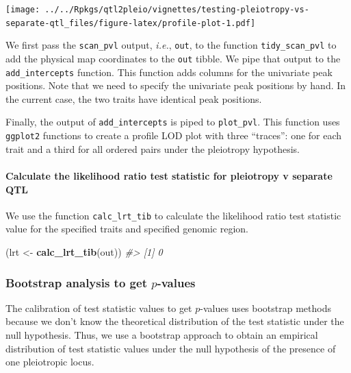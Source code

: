 \documentclass[oneside]{book}\usepackage[]{graphicx}\usepackage[]{color}
\newenvironment{Shaded}{\begin{snugshade}}{\end{snugshade}}
\newcommand{\CommentTok}[1]{\textcolor[rgb]{0.56,0.35,0.01}{\textit{#1}}}
\newcommand{\KeywordTok}[1]{\textcolor[rgb]{0.13,0.29,0.53}{\textbf{#1}}}
\newcommand{\NormalTok}[1]{#1}
\newcommand{\StringTok}[1]{\textcolor[rgb]{0.31,0.60,0.02}{#1}}
\begin{document}
\texttt{[image: ../../Rpkgs/qtl2pleio/vignettes/testing-pleiotropy-vs-separate-qtl\_files/figure-latex/profile-plot-1.pdf]}

We first pass the \texttt{scan\_pvl} output, \emph{i.e.}, \texttt{out},
to the function \texttt{tidy\_scan\_pvl} to add the physical map
coordinates to the \texttt{out} tibble. We pipe that output to the
\texttt{add\_intercepts} function. This function adds columns for the
univariate peak positions. Note that we need to specify the univariate
peak positions by hand. In the current case, the two traits have
identical peak positions.

Finally, the output of \texttt{add\_intercepts} is piped to
\texttt{plot\_pvl}. This function uses \texttt{ggplot2} functions to
create a profile LOD plot with three ``traces'': one for each trait and
a third for all ordered pairs under the pleiotropy hypothesis.

\hypertarget{calculate-the-likelihood-ratio-test-statistic-for-pleiotropy-v-separate-qtl}{%
\paragraph{Calculate the likelihood ratio test statistic for pleiotropy
v separate
QTL}\label{calculate-the-likelihood-ratio-test-statistic-for-pleiotropy-v-separate-qtl}}

We use the function \texttt{calc\_lrt\_tib} to calculate the likelihood
ratio test statistic value for the specified traits and specified
genomic region.

\begin{Shaded}
\begin{Highlighting}[]
\NormalTok{(lrt <-}\StringTok{ }\KeywordTok{calc_lrt_tib}\NormalTok{(out))}
\CommentTok{#> [1] 0}
\end{Highlighting}
\end{Shaded}

\hypertarget{bootstrap-analysis-to-get-p-values}{%
\subsubsection{Bootstrap analysis to get
$p$-values}\label{bootstrap-analysis-to-get-p-values}}

The calibration of test statistic values to get $p$-values uses bootstrap
methods because we don't know the theoretical distribution of the test
statistic under the null hypothesis. Thus, we use a bootstrap approach
to obtain an empirical distribution of test statistic values under the
null hypothesis of the presence of one pleiotropic locus.
\end{document}
